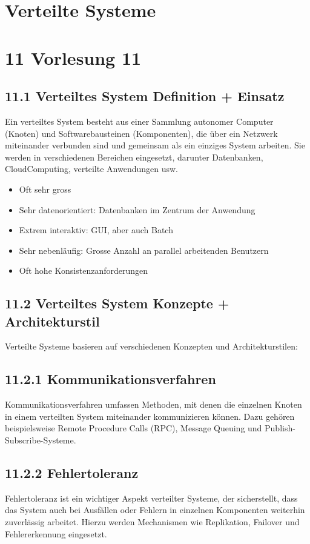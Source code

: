\section{Verteilte Systeme}

\section*{11 Vorlesung 11}
\subsection*{11.1 Verteiltes System Definition + Einsatz}
Ein verteiltes System besteht aus einer Sammlung autonomer Computer (Knoten) und Softwarebausteinen (Komponenten), die über ein Netzwerk miteinander verbunden sind und gemeinsam als ein einziges System arbeiten. Sie werden in verschiedenen Bereichen eingesetzt, darunter Datenbanken, CloudComputing, verteilte Anwendungen usw.

\begin{itemize}
  \item Oft sehr gross
  \item Sehr datenorientiert: Datenbanken im Zentrum der Anwendung
  \item Extrem interaktiv: GUI, aber auch Batch
  \item Sehr nebenläufig: Grosse Anzahl an parallel arbeitenden Benutzern
  \item Oft hohe Konsistenzanforderungen
\end{itemize}

\subsection*{11.2 Verteiltes System Konzepte + Architekturstil}
Verteilte Systeme basieren auf verschiedenen Konzepten und Architekturstilen:

\subsection*{11.2.1 Kommunikationsverfahren}
Kommunikationsverfahren umfassen Methoden, mit denen die einzelnen Knoten in einem verteilten System miteinander kommunizieren können. Dazu gehören beispielsweise Remote Procedure Calls (RPC), Message Queuing und Publish-Subscribe-Systeme.

\subsection*{11.2.2 Fehlertoleranz}
Fehlertoleranz ist ein wichtiger Aspekt verteilter Systeme, der sicherstellt, dass das System auch bei Ausfällen oder Fehlern in einzelnen Komponenten weiterhin zuverlässig arbeitet. Hierzu werden Mechanismen wie Replikation, Failover und Fehlererkennung eingesetzt.


